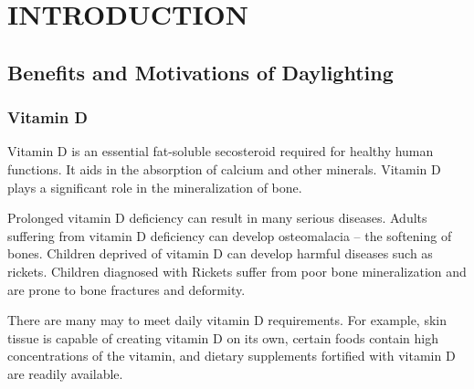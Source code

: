 \chapter{INTRODUCTION} \label{sec:introduction}



\section {Benefits and Motivations of Daylighting}

\subsection{Vitamin D}
Vitamin D is an essential fat-soluble secosteroid required for healthy human functions. It aids in the absorption of calcium and other minerals. Vitamin D plays a significant role in the mineralization of bone\cite{Ross}.   

Prolonged vitamin D deficiency can result in many serious diseases.
Adults suffering from vitamin D deficiency can develop osteomalacia -- the softening of bones. Children deprived of vitamin D can develop harmful diseases such as rickets. Children diagnosed with Rickets suffer from poor bone mineralization and are prone to bone fractures and deformity\cite{Pettifor}.

There are many may to meet daily vitamin D requirements. For example, skin tissue is capable of creating vitamin D on its own, certain foods contain high concentrations of the vitamin, and dietary supplements fortified with vitamin D are readily available\cite{Ross}.

